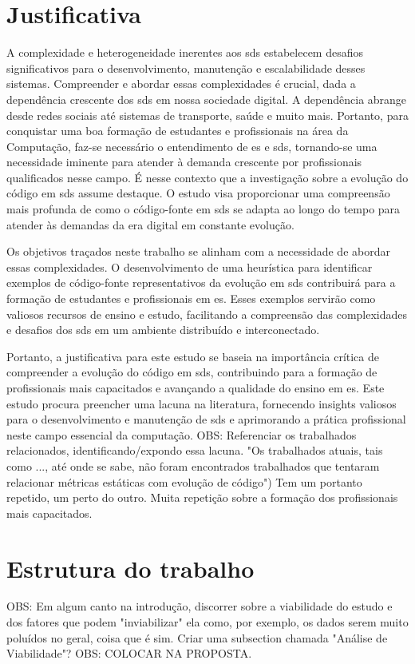\section{Justificativa}\label{sec:justificativa}
A complexidade e heterogeneidade inerentes aos \gls{sds} estabelecem desafios significativos para o desenvolvimento, manutenção e escalabilidade desses sistemas. Compreender e abordar essas complexidades é crucial, dada a dependência crescente dos \gls{sds} em nossa sociedade digital. A dependência abrange desde redes sociais até sistemas de transporte, saúde e muito mais. Portanto, para conquistar uma boa formação de estudantes e profissionais na área da Computação, faz-se necessário o entendimento de \gls{es} e \gls{sds}, tornando-se uma necessidade iminente para atender à demanda crescente por profissionais qualificados nesse campo.
É nesse contexto que a investigação sobre a evolução do código em \gls{sds} assume destaque. O estudo visa proporcionar uma compreensão mais profunda de como o código-fonte em \gls{sds} se adapta ao longo do tempo para atender às demandas da era digital em constante evolução.

Os objetivos traçados neste trabalho se alinham com a necessidade de abordar essas complexidades. O desenvolvimento de uma heurística para identificar exemplos de código-fonte representativos da evolução em \gls{sds} contribuirá para a formação de estudantes e profissionais em \gls{es}. Esses exemplos servirão como valiosos recursos de ensino e estudo, facilitando a compreensão das complexidades e desafios dos \gls{sds} em um ambiente distribuído e interconectado.

Portanto, a justificativa para este estudo se baseia na importância crítica de compreender a evolução do código em \gls{sds}, contribuindo para a formação de profissionais mais capacitados e avançando a qualidade do ensino em \gls{es}. Este estudo procura preencher uma lacuna na literatura, fornecendo insights valiosos para o desenvolvimento e manutenção de \gls{sds} e aprimorando a prática profissional neste campo essencial da computação.
OBS: Referenciar os trabalhados relacionados, identificando/expondo essa lacuna. "Os trabalhados atuais, tais como ..., até onde se sabe, não foram encontrados trabalhados que tentaram relacionar métricas estáticas com evolução de código")
Tem um portanto repetido, um perto do outro.
Muita repetição sobre a formação dos profissionais mais capacitados.

\section{Estrutura do trabalho}\label{sec:estruturaTrabalho}

OBS: Em algum canto na introdução, discorrer sobre a viabilidade do estudo e dos fatores que podem "inviabilizar" ela como, por exemplo, os dados serem muito poluídos no geral, coisa que é sim. Criar uma subsection chamada "Análise de Viabilidade"? OBS: COLOCAR NA PROPOSTA.